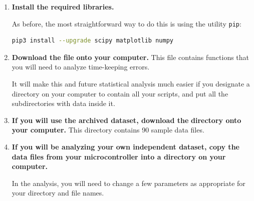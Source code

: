 \begin{enumerate}
	\item \textbf{Install the required \python libraries.}
	
	As before, the most straightforward way to do this is using the utility \lstinline{pip}:
\begin{lstlisting}[language=bash]
pip3 install --upgrade scipy matplotlib numpy
\end{lstlisting}	
	
	\item \textbf{Download the file}  \textbf{ onto your computer.}
	This file contains functions that you will need to analyze time-keeping errors.
	
	\smallskip
	It will make this and future statistical analysis much easier if you designate a directory on your computer to contain all your \python scripts, and put all the subdirectories with data inside it.
	
	
	\item \textbf{If you will use the archived dataset, download the}  \textbf{ directory onto your computer.}
	This directory contains 90 sample data files.
		
	\item \textbf{If you will be analyzing your own independent dataset, copy the data files from your microcontroller into a directory on your computer.}
	
	In the analysis, you will need to change a few parameters as appropriate for your directory and file names.
	

\end{enumerate}
